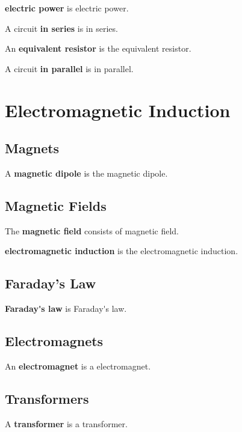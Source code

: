 \documentclass[dvipsnames]{article}
\newif\ifShowUnitXII
\begin{document}
\textbf{\Gls{electric power}} is \glsdesc{electric power}.

A circuit \textbf{\gls{in series}} is \glsdesc{in series}.

An \textbf{\gls{equivalent resistor}} is the \glsdesc{equivalent resistor}.


A circuit \textbf{\gls{in parallel}} is \glsdesc{in parallel}.


\fi

\clearpage

\section{Electromagnetic Induction}

\ifShowUnitXII

\subsection{Magnets}

A \textbf{\gls{magnetic dipole}} is the \glsdesc{magnetic dipole}.


\subsection{Magnetic Fields}


The \textbf{\gls{magnetic field}} consists of \glsdesc{magnetic field}.


\textbf{\Gls{electromagnetic induction}} is the \glsdesc{electromagnetic induction}.

\subsection{Faraday's Law}

\textbf{\gls{Faraday's law}} is \glsdesc{Faraday's law}.

\clearpage

\subsection{Electromagnets}

An \textbf{\gls{electromagnet}} is a \glsdesc{electromagnet}.


\subsection{Transformers}

A \textbf{\gls{transformer}} is a \glsdesc{transformer}.
\end{document}

